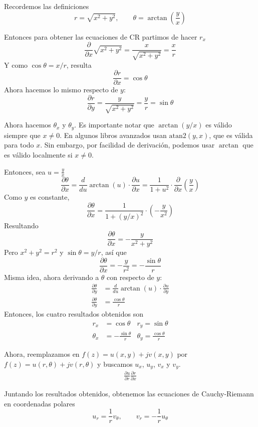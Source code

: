 Recordemos las definiciones
\[
  r = \sqrt{x^2 + y^2}, \qquad \theta = \arctan\left(\frac{y}{x}\right)
\]

Entonces para obtener las ecuaciones de CR partimos de hacer $r_x$
\[
  \frac{\partial}{\partial x}\sqrt{x^2+y^2}=\frac{x}{\sqrt{x^2+y^2}} = \frac{x}{r}
\]
Y como $\cos\theta = x/r$, resulta
\[
  \frac{\partial r}{\partial x} = \cos \theta
\]
Ahora hacemos lo mismo respecto de $y$:
\[
  \frac{\partial r}{\partial y} = \frac{y}{\sqrt{x^2+y^2}} = \frac{y}{r} = \sin \theta
\]

Ahora hacemos $\theta_x$ y $\theta_y$. Es importante notar que $\arctan(y/x)$ es válido siempre que $x\neq 0$. En algunos libros avanzados usan \href{https://en.wikipedia.org/wiki/Atan2}{$\text{atan}2(y,x)$}, que es válida para todo $x$. Sin embargo, por facilidad de derivación, podemos usar $\arctan$ que es válido localmente si $x\neq 0$.

Entonces, sea $u=\frac{y}{x}$
\[
  \frac{\partial \theta}{\partial x} = \frac{d}{du}\arctan(u)\cdot\frac{\partial u}{\partial x} = \frac{1}{1+u^2}\cdot \frac{\partial}{\partial x}\left(\frac{y}{x}\right)
\]
Como $y$ es constante,
\[
  \frac{\partial \theta}{\partial x} = \frac{1}{1+(y/x)^2}\cdot \left(-\frac{y}{x^2}\right)
\]
Resultando
\[
  \frac{\partial \theta}{\partial x} = -\frac{y}{x^2 + y^2}
\]
Pero $x^2 + y^2=r^2$ y $\sin \theta = y/r$, así que 
\[
  \frac{\partial \theta}{\partial x} = -\frac{y}{r^2} = -\frac{\sin\theta}{r}
\]
Misma idea, ahora derivando a $\theta$ con respecto de $y$:
\begin{align*}
  \frac{\partial \theta}{\partial y} &= \frac{d}{du}\arctan(u)\cdot\frac{\partial u}{\partial y} \\ 
  \frac{\partial \theta}{\partial y} &= \frac{\cos \theta}{r}
\end{align*}
Entonces, los cuatro resultados obtenidos son
\begin{align*}
  r_x &= \cos \theta &r_y = \sin \theta \\ 
  \theta_x &= -\frac{\sin \theta}{r} &\theta_y =\frac{\cos \theta}{r}
\end{align*}

Ahora, reemplazamos en $f(z)=u(x,y)+jv(x,y)$ por $f(z)=u(r,\theta)+jv(r,\theta)$ y buscamos $u_x$, $u_y$, $v_x$ y $v_y$.
\begin{align*}
  \frac{\partial u}{\partial r}\frac{\partial r}{\partial x}
\end{align*}

Juntando los resultados obtenidos, obtenemos las ecuaciones de Cauchy-Riemann en coordenadas polares
\begin{equation}
  u_r = \frac{1}{r}v_\theta, \qquad v_r =  -\frac{1}{r}u_\theta
\end{equation} 
